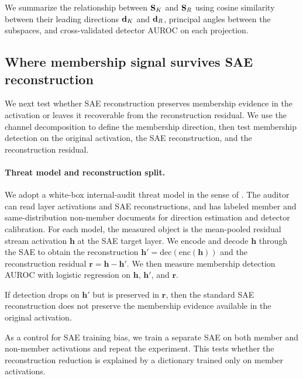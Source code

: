 We summarize the relationship between $\mathbf{S}_K$ and $\mathbf{S}_R$ using cosine similarity between their leading directions $\mathbf{d}_K$ and $\mathbf{d}_R$, principal angles between
the subspaces, and cross-validated detector AUROC on each projection.

\subsection{Where membership signal survives SAE reconstruction}
\label{sec:methods:sae_recon}

We next test whether SAE reconstruction preserves membership evidence in the activation or leaves it recoverable from the reconstruction residual. We use the channel decomposition to define the membership direction, then test membership detection on the original activation, the SAE reconstruction, and the reconstruction residual.

\paragraph{Threat model and reconstruction split.}
We adopt a white-box internal-audit threat model in the sense of \citet{carlini2023quantifying}. The auditor can read layer activations and SAE
reconstructions, and has labeled member and same-distribution non-member documents for direction estimation and detector calibration. For each model, the
measured object is the mean-pooled residual stream activation $\mathbf{h}$ at the SAE target layer. We encode and decode $\mathbf{h}$ through the SAE to
obtain the reconstruction $\mathbf{h}' = \text{dec}(\text{enc}(\mathbf{h}))$ and the reconstruction residual $\mathbf{r} = \mathbf{h} - \mathbf{h}'$. We
then measure membership detection AUROC with logistic regression on $\mathbf{h}$, $\mathbf{h}'$, and $\mathbf{r}$.

If detection drops on $\mathbf{h}'$ but is preserved in $\mathbf{r}$, then the standard SAE reconstruction does not preserve the membership evidence
available in the original activation.

As a control for SAE training bias, we train a separate SAE on both member and non-member activations and repeat the experiment. This tests whether the
reconstruction reduction is explained by a dictionary trained only on member activations.

